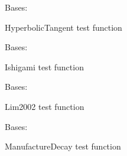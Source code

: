 \documentclass[letterpaper,10pt,english,openany,oneside]{sphinxmanual}
\begin{document}

\begin{fulllineitems}
\label{\detokenize{pygpc:pygpc.Test.HyperbolicTangent}}
Bases: {\hyperref[\detokenize{pygpc:pygpc.Test.Test}]{}}

HyperbolicTangent test function

\end{fulllineitems}


\begin{fulllineitems}
\label{\detokenize{pygpc:pygpc.Test.Ishigami}}
Bases: {\hyperref[\detokenize{pygpc:pygpc.Test.Test}]{}}

Ishigami test function

\end{fulllineitems}


\begin{fulllineitems}
\label{\detokenize{pygpc:pygpc.Test.Lim2002}}
Bases: {\hyperref[\detokenize{pygpc:pygpc.Test.Test}]{}}

Lim2002 test function

\end{fulllineitems}


\begin{fulllineitems}
\label{\detokenize{pygpc:pygpc.Test.ManufactureDecay}}
Bases: {\hyperref[\detokenize{pygpc:pygpc.Test.Test}]{}}

ManufactureDecay test function

\end{fulllineitems}
\end{document}
